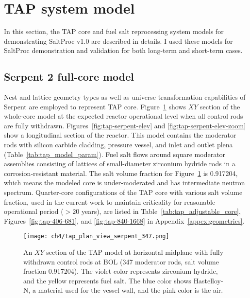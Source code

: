 \section{TAP system model} \label{sec:tap_model}
In this section, the \gls{TAP} core and fuel salt reprocessing system models  
for demonstrating SaltProc v1.0 are described in details. I used these models 
for SaltProc demonstration and validation for both long-term and short-term 
cases.

\subsection{Serpent 2 full-core model} 
Nest and lattice geometry types as well as universe transformation 
capabilities of Serpent \cite{leppanen_serpent_2014} are employed to 
represent \gls{TAP} core. Figure~\ref{fig:tap-serpent-plan} shows $XY$ section 
of the whole-core model at the expected reactor operational level 
when all control rods are fully withdrawn. Figures~\ref{fig:tap-serpent-elev} 
and \ref{fig:tap-serpent-elev-zoom} show a longitudinal section of the 
reactor. This model contains the moderator rods with silicon carbide cladding, 
pressure vessel, and inlet and outlet plena (Table~\ref{tab:tap_model_param}). 
Fuel salt flows around square moderator assemblies consisting of lattices 
of small-diameter zirconium hydride rods in a corrosion-resistant material. 
The salt volume fraction for Figure~\ref{fig:tap-serpent-plan} is 0.917204, 
which means the modeled core is under-moderated and has intermediate neutron 
spectrum. Quarter-core configurations of the \gls{TAP} core with various salt 
volume fraction, used in the current work to maintain criticality for 
reasonable operational period ($>20$ years), are listed in 
Table~\ref{tab:tap_adjustable_core}, Figures~\ref{fig:tap-406-681}, and 
\ref{fig:tap-840-1668} in Appendix~\ref{appex:geometries}.
\begin{figure}[htp!] %
	\centering
	\texttt{[image: ch4/tap\_plan\_view\_serpent\_347.png]}
	\caption{An $XY$ section of the \gls{TAP} model at horizontal midplane 
		with fully withdrawn control rods at \gls{BOL} (347 moderator rods, 
		salt volume fraction 0.917204). 
		The violet color represents zirconium hydride, and the yellow 
		represents fuel salt. 
		The blue color shows Hastelloy-N, a material used for the vessel wall, 
		and the pink color is the air.}
	\label{fig:tap-serpent-plan}
\end{figure}

